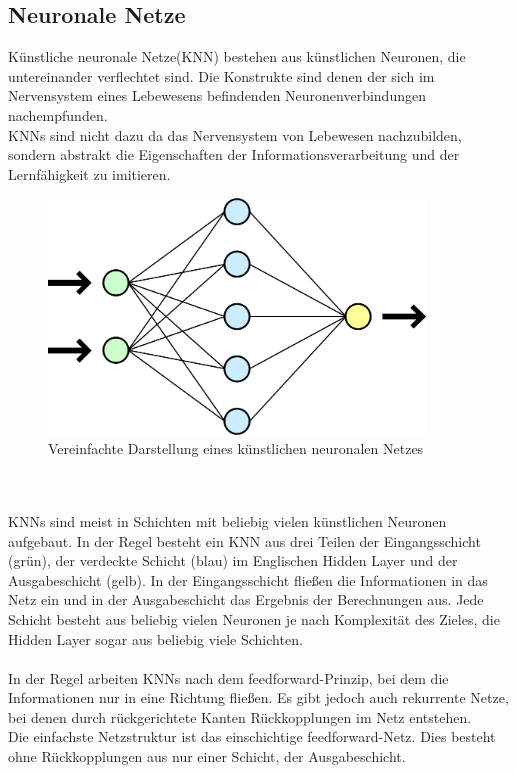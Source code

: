 \documentclass[12pt,oneside,a4paper,parskip]{scrbook}
\begin{document}
\subsection{Neuronale Netze}
Künstliche neuronale Netze(KNN) bestehen aus künstlichen Neuronen, die untereinander verflechtet sind. Die Konstrukte sind denen der sich im Nervensystem eines Lebewesens befindenden Neuronenverbindungen nachempfunden. \\
KNNs sind nicht dazu da das Nervensystem von Lebewesen nachzubilden, sondern abstrakt die Eigenschaften der Informationsverarbeitung und der Lernfähigkeit zu imitieren.
\begin{figure}[h]
	\begin{center}
		\includegraphics[width=10cm]{Bilder/Neurales_Netz.png}
		\caption{Vereinfachte Darstellung eines künstlichen neuronalen Netzes\cite{wikiNN2}}
		\label{fig:wikiNeuronalesNetz}
	\end{center}
\end{figure}
\\\\KNNs sind meist in Schichten mit beliebig vielen künstlichen Neuronen aufgebaut. In der Regel besteht ein KNN aus drei Teilen der Eingangsschicht (grün), der verdeckte Schicht (blau) im Englischen Hidden Layer und der Ausgabeschicht (gelb). In der Eingangsschicht fließen die Informationen in das Netz ein und in der Ausgabeschicht das Ergebnis der Berechnungen aus. Jede Schicht besteht aus beliebig vielen Neuronen je nach Komplexität des Zieles, die Hidden Layer sogar aus beliebig viele Schichten.
\\\\
In der Regel arbeiten KNNs nach dem feedforward-Prinzip, bei dem die Informationen nur in eine Richtung fließen. Es gibt jedoch auch rekurrente Netze, bei denen durch rückgerichtete Kanten Rückkopplungen im Netz entstehen. \\
Die einfachste Netzstruktur ist das einschichtige feedforward-Netz. Dies besteht ohne Rückkopplungen aus nur einer Schicht, der Ausgabeschicht.
\end{document}
